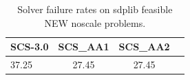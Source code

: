 \begin{table}
\centering
\caption{Solver failure rates on sdplib feasible NEW noscale problems.}
\label{t-sdplib feasible NEW noscale-failure}
\begin{tabular}{lccc}
\toprule
 SCS-3.0 &  SCS\_AA1 &  SCS\_AA2 \\
\midrule
   37.25 &    27.45 &    27.45 \\
\bottomrule
\end{tabular}
\end{table}

